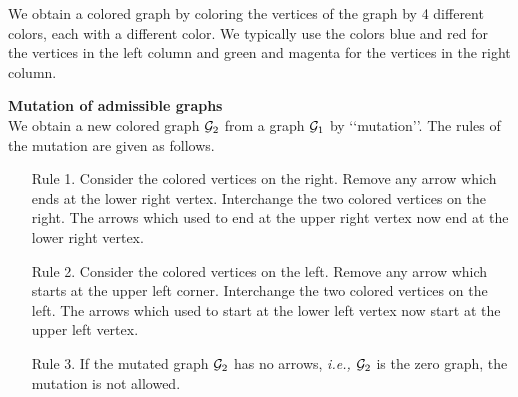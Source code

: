 We obtain a colored graph by coloring  the vertices
 of the graph by 4 different colors, each with a different color. We typically use the colors {\color{blue} blue } and {\color{red} red }
 for the vertices in the left column and {\color{green} green} and {\color{magenta} magenta } for the vertices in the right column.

\medskip
\noindent
{\bf Mutation of  admissible graphs} \\
We obtain a new colored graph ${\cal G}_2$  from a graph ${\cal G}_1$ 
 by 
\lq\lq{mutation}\rq\rq.  
The rules of the mutation are given as follows.  
\begin{enumerate}
\item
[Rule 1.]  Consider the colored vertices on the right. 
Remove any arrow which ends at the lower right vertex. 
Interchange  the two colored  vertices on the right.  
The arrows which used to end at the upper right vertex now
 end at the lower right vertex.
\item
[Rule 2.] Consider the colored vertices on the left. 
Remove any arrow which starts at the upper left corner. 
Interchange the two colored vertices on the left. 
The arrows which used to start at the lower left vertex now start at the upper left vertex.
\item[Rule 3.] If the mutated graph ${\cal G}_2$ has no arrows, 
 {\it{i.e., }} ${\cal G}_2$ is the zero graph,  the mutation is not allowed.
\end{enumerate}

